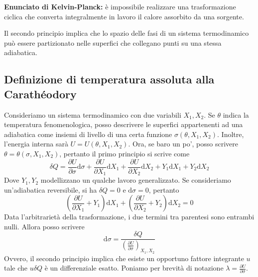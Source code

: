 \documentclass[a4paper,11pt]{article}
\begin{document}
\noindent\textbf{Enunciato di Kelvin-Planck:} è impossibile realizzare una trasformazione ciclica che converta integralmente in lavoro il calore assorbito da una sorgente.

\noindent Il secondo principio implica che lo spazio delle fasi di un sistema termodinamico può essere partizionato nelle superfici che collegano punti su una stessa adiabatica.

\subsection{Definizione di temperatura assoluta alla Carathéodory}
Consideriamo un sistema termodinamico con due variabili $X_1,X_2$. Se $\theta$ indica la temperatura fenomenologica, posso descrivere le superfici appartenenti ad una adiabatica come insiemi di livello di una certa funzione $\sigma(\theta,X_1,X_2)$. Inoltre, l'energia interna sarà $U=U(\theta,X_1,X_2)$. Ora, se baro un po', posso scrivere $\theta=\theta(\sigma,X_1,X_2)$, pertanto il primo principio si scrive come
\[\delta Q=\frac{\partial U}{\partial \sigma}\mathrm{d}\sigma+\frac{\partial U}{\partial X_1}\mathrm{d}X_1+\frac{\partial U}{\partial X_2}\mathrm{d}X_2+Y_1\mathrm{d}X_1+Y_2\mathrm{d}X_2\]
Dove $Y_1,Y_2$ modellizzano un qualche lavoro generalizzato. Se consideriamo un'adiabatica reversibile, si ha $\delta Q=0$ e $\mathrm{d}\sigma=0$, pertanto
\[\left(\frac{\partial U}{\partial X_1}+Y_1\right)\mathrm{d}X_1+\left(\frac{\partial U}{\partial X_2}+Y_2\right)\mathrm{d}X_2=0\]
Data l'arbitrarietà della trasformazione, i due termini tra parentesi sono entrambi nulli. Allora posso scrivere
\[\mathrm{d}\sigma=\frac{\delta Q}{\left(\frac{\partial U}{\partial \sigma}\right)_{X_1,X_2}}\]
Ovvero, il secondo principio implica che esiste un opportuno fattore integrante $u$ tale che $u\delta Q$ è un differenziale esatto. Poniamo per brevità di notazione $\lambda=\frac{\partial U}{\partial \sigma}$.
\vspace{5mm}
\end{document}
